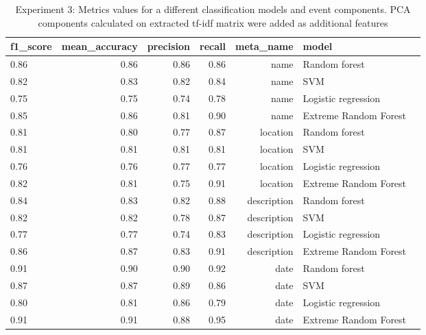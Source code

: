 \begin{table}[h]
\begin{center}
{\renewcommand{\arraystretch}{1.2}
\begin{tabular}{lrrrrll}
\toprule
f1\_score &  mean\_accuracy &  precision &  recall &    meta\_name &                  model \\
\midrule
0.86 &           0.86 &       0.86 &    0.86 &         name &          Random forest \\
0.82 &           0.83 &       0.82 &    0.84 &         name &                    SVM \\
0.75 &           0.75 &       0.74 &    0.78 &         name &    Logistic regression \\
0.85 &           0.86 &       0.81 &    0.90 &         name &  Extreme Random Forest \\
\midrule
0.81 &           0.80 &       0.77 &    0.87 &     location &          Random forest \\
0.81 &           0.81 &       0.81 &    0.81 &     location &                    SVM \\
0.76 &           0.76 &       0.77 &    0.77 &     location &    Logistic regression \\
0.82 &           0.81 &       0.75 &    0.91 &     location &  Extreme Random Forest \\
\midrule
0.84 &           0.83 &       0.82 &    0.88 &  description &          Random forest \\
0.82 &           0.82 &       0.78 &    0.87 &  description &                    SVM \\
0.77 &           0.77 &       0.74 &    0.83 &  description &    Logistic regression \\
0.86 &           0.87 &       0.83 &    0.91 &  description &  Extreme Random Forest \\
\midrule
0.91 &           0.90 &       0.90 &    0.92 &         date &          Random forest \\
0.87 &           0.87 &       0.89 &    0.86 &         date &                    SVM \\
0.80 &           0.81 &       0.86 &    0.79 &         date &    Logistic regression \\
0.91 &           0.91 &       0.88 &    0.95 &         date &  Extreme Random Forest \\
\bottomrule
\end{tabular}}
\caption{Experiment 3: Metrics values for a different classification models and event components. PCA components calculated on extracted tf-idf matrix were added as additional features}
\label{table:sumresultPCA}
\end{center}
\end{table} 

